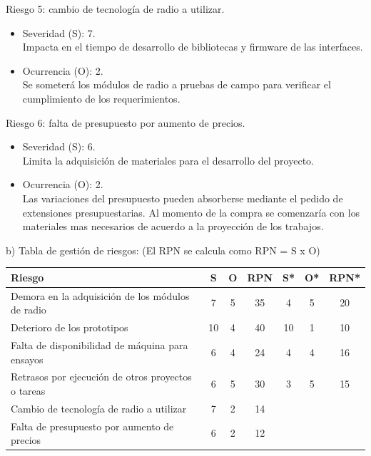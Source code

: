 \documentclass[
11pt%
]{charter}
\begin{document}
Riesgo 5: cambio de tecnología de radio a utilizar.
\begin{itemize}
	\item Severidad (S): 7.\\Impacta en el tiempo de desarrollo de bibliotecas y firmware de las interfaces.
	\item Ocurrencia (O): 2.\\Se someterá los módulos de radio a pruebas de campo para verificar el cumplimiento de los requerimientos.
\end{itemize}

Riesgo 6: falta de presupuesto por aumento de precios.
\begin{itemize}
	\item Severidad (S): 6.\\Limita la adquisición de materiales para el desarrollo del proyecto.
	\item Ocurrencia (O): 2.\\Las variaciones del presupuesto pueden absorberse mediante el pedido de extensiones presupuestarias. Al momento de la compra se comenzaría con los materiales mas necesarios de acuerdo a la proyección de los trabajos.
\end{itemize}

b) Tabla de gestión de riesgos:      (El RPN se calcula como RPN = S x O)

\begin{table}[htpb]
\centering
\begin{tabularx}{\linewidth}{@{}|X|c|c|c|c|c|c|@{}}
\hline
\rowcolor[HTML]{C0C0C0} 
Riesgo & S & O & RPN & S* & O* & RPN* \\ \hline
       Demora en la adquisición de los módulos de radio& 7  &  5 &  35   &   4 &  5  &  20    \\ \hline
       Deterioro de los prototipos&  10 &  4&  40   &  10  & 1   &    10  \\ \hline
       Falta de disponibilidad de máquina para ensayos&  6 &  4 & 24    &4    &  4  &  16   \\ \hline
       Retrasos por ejecución de otros proyectos o tareas&  6 &  5 &  30   &  3  &   5 &  15    \\ \hline
       Cambio de tecnología de radio a utilizar&   7& 2   & 14 &    &    &      \\ \hline
       Falta de presupuesto por aumento de precios&   6& 2   & 12 &    &    &      \\ \hline
\end{tabularx}%
\end{table}
\end{document}
